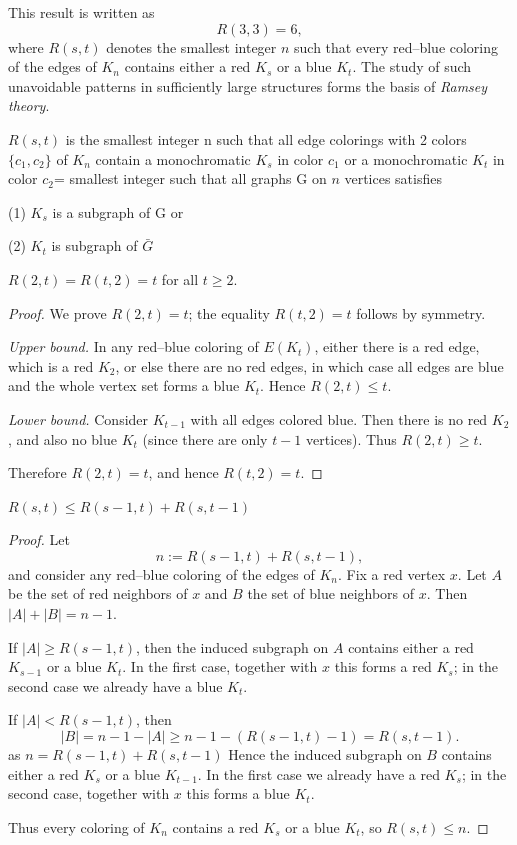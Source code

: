 \documentclass[11pt, a4paper]{ctexrep}
\begin{document}
This result is written as
\[
    R(3,3)=6,
\]
where $R(s,t)$ denotes the smallest integer $n$ such that every
red--blue coloring of the edges of $K_n$ contains either a red $K_s$
or a blue $K_t$. The study of such unavoidable patterns in sufficiently
large structures forms the basis of \emph{Ramsey theory}.

$R(s,t)$ is the smallest integer n such that all edge colorings with 2 colors $\{ c_1,c_2 \}$ of $K_n$ contain a monochromatic $K_s$ in color $c_1$ or a monochromatic $K_t$ in color $c_2$= smallest integer such that all graphs G on $n$ vertices satisfies

(1) $K_s$ is a subgraph of G or

(2) $K_t$ is subgraph of $\bar{G}$

\begin{corollary}
    $R(2,t)=R(t,2)=t$ for all $t \ge 2$.
\end{corollary}

\begin{proof}
    We prove $R(2,t)=t$; the equality $R(t,2)=t$ follows by symmetry.

    \emph{Upper bound.} In any red--blue coloring of $E(K_t)$, either there is a red edge, which is a red $K_2$, or else there are no red edges, in which case all edges are blue and the whole vertex set forms a blue $K_t$. Hence $R(2,t)\le t$.

    \emph{Lower bound.} Consider $K_{t-1}$ with all edges colored blue. Then there is no red $K_2$, and also no blue $K_t$ (since there are only $t-1$ vertices). Thus $R(2,t)\ge t$.

    Therefore $R(2,t)=t$, and hence $R(t,2)=t$.
\end{proof}

\begin{proposition}
    $R(s,t) \le R(s-1,t)+R(s,t-1)$
\end{proposition}

\begin{proof}
    Let
    \[
        n:=R(s-1,t)+R(s,t-1),
    \]
    and consider any red--blue coloring of the edges of $K_n$.
    Fix a red vertex $x$. Let $A$ be the set of red neighbors of $x$ and $B$ the
    set of blue neighbors of $x$. Then $|A|+|B|=n-1$.

    If $|A|\ge R(s-1,t)$, then the induced subgraph on $A$ contains either a
    red $K_{s-1}$ or a blue $K_t$. In the first case, together with $x$ this
    forms a red $K_s$; in the second case we already have a blue $K_t$.

    If $|A|<R(s-1,t)$, then
    \[
        |B|=n-1-|A|\ge n-1-(R(s-1,t)-1)=R(s,t-1).
    \]
    as $n=R(s-1,t)+R(s,t-1)$
    Hence the induced subgraph on $B$ contains either a red $K_s$ or a blue
    $K_{t-1}$. In the first case we already have a red $K_s$; in the second
    case, together with $x$ this forms a blue $K_t$.

    Thus every coloring of $K_n$ contains a red $K_s$ or a blue $K_t$, so
    $R(s,t)\le n$.
\end{proof}
\end{document}
